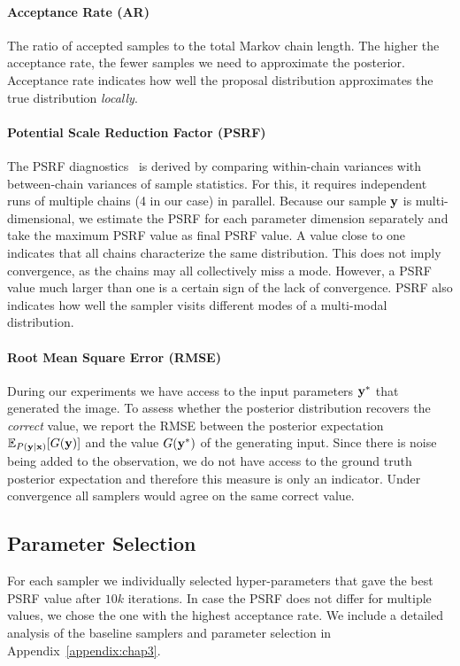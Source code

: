 \paragraph{Acceptance Rate (AR)}
The ratio of accepted samples to the total Markov chain length.  The higher
the acceptance rate, the fewer samples we need to approximate the
posterior.  Acceptance rate indicates how well the proposal distribution
approximates the true distribution \emph{locally}.
%
\paragraph{Potential Scale Reduction Factor (PSRF)}
The PSRF diagnostics~\cite{gelman1992psrf,brooks1998convergence} is
derived by comparing within-chain variances with between-chain
variances of sample statistics.  For this, it requires independent
runs of multiple chains (4 in our case) in parallel. Because our
sample $\mathbf{y}$ is multi-dimensional, we estimate the PSRF for each
parameter dimension separately and take the maximum PSRF value as
final PSRF value. A value close to one indicates that all chains
characterize the same distribution. This does not imply convergence,
as the chains may all collectively miss a mode. However, a PSRF value
much larger than one is a certain sign of the lack of convergence.
PSRF also indicates how well the sampler visits different modes of
a multi-modal distribution.

\paragraph{Root Mean Square Error (RMSE)}
During our experiments we have access to the input parameters
$\mathbf{y}^*$ that generated the image. To assess whether the posterior
distribution recovers the \emph{correct} value, we report the RMSE between
the posterior expectation $\mathbb{E}_{P(\mathbf{y} |\mathbf{x})}[G(\mathbf{y})]$
and the value $G(\mathbf{y}^*)$ of the generating input. Since there is
noise being added to the observation, we do not have access to the
ground truth posterior expectation and therefore this measure is only
an indicator. Under convergence all samplers would agree on the same
correct value.


\subsection{Parameter Selection}

For each sampler we individually selected hyper-parameters that gave
the best PSRF value after $10k$ iterations. In case the PSRF does not
differ for multiple values, we chose the one with the highest acceptance
rate.  We include a detailed analysis of the baseline samplers and parameter
selection in Appendix~\ref{appendix:chap3}.


